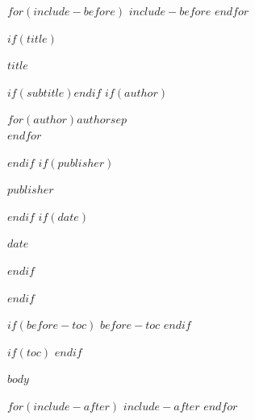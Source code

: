 \documentclass[
  $if(classoption)$$for(classoption)$$classoption$$sep$,$endfor$$else$oneside$endif$,
  $if(fontsize)$$fontsize$$else$11pt$endif$
]{scrbook}
\newcommand{\PrintTitle}{
  \begin{titlepage}
    \centering
    {\sffamily\bfseries\LARGE $title$ \par}
    $if(subtitle)$\vspace{6pt}{\sffamily\large $subtitle$ \par}$endif$
    \vspace{18pt}
    $if(author)$
      {\sffamily\normalsize $for(author)$$author$$sep$ \\ $endfor$ \par}
    $endif$
    \vspace{12pt}
    $if(publisher)$
      {\sffamily\small $publisher$ \par}
    $endif$
    \vfill
    $if(date)$
      {\sffamily\small $date$ \par}
    $endif$
  \end{titlepage}
}
\begin{document}
$for(include-before)$
$include-before$
$endfor$

\frontmatter
$if(title)$
\PrintTitle
$endif$

$if(before-toc)$
$before-toc$
\clearpage
$endif$

$if(toc)$
{\hypersetup{linkcolor=black}
\tableofcontents
\clearpage}
$endif$

\mainmatter

$body$

$for(include-after)$
$include-after$
$endfor$
\end{document}
